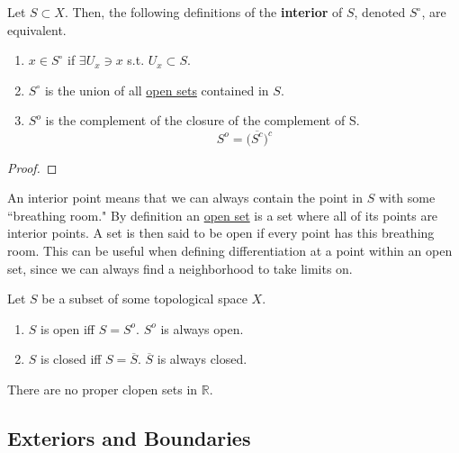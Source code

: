   \begin{definition}[Interior]
    \label{def:interior}
    Let $S \subset X$. Then, the following definitions of the \textbf{interior} of $S$, denoted $S^\circ$, are equivalent. 
    \begin{enumerate}
      \item $x \in S^\circ$ if $\exists U_x \ni x$ s.t. $U_x \subset S$. 
      \item $S^\circ$ is the union of all \hyperref[def:open-set]{open sets} contained in $S$. 
      \item $S^{o}$ is the complement of the closure of the complement of S. 
      \begin{equation}
        S^{o} = \big(\overline{S^{c}}\big)^{c}
      \end{equation}
    \end{enumerate}
  \end{definition}
  \begin{proof}
    
  \end{proof}

  An interior point means that we can always contain the point in $S$ with some ``breathing room." By definition an \hyperref[def:open-set]{open set} is a set where all of its points are interior points. A set is then said to be open if every point has this breathing room. This can be useful when defining differentiation at a point within an open set, since we can always find a neighborhood to take limits on. 

  \begin{lemma}
    \label{thm:open-and-closed-in-terms-of-interiors-and}
    Let $S$ be a subset of some topological space $X$. 
    \begin{enumerate}
      \item $S$ is open iff $S = S^{o}$. $S^{o}$ is always open.
      \item $S$ is closed iff $S = \overline{S}$. $\overline{S}$ is always closed. 
    \end{enumerate}
  \end{lemma}

  \begin{theorem}
    \label{thm:clopen-sets-in-reals}
    There are no proper clopen sets in $\mathbb{R}$. 
  \end{theorem}

\subsection{Exteriors and Boundaries}

